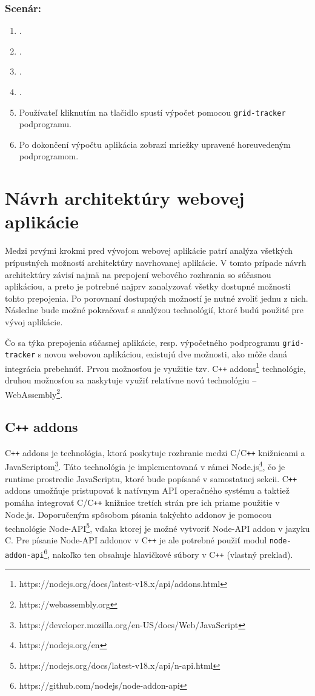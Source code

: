 \subsubsection*{Scenár:}
\begin {enumerate}
\item {}.
\item {}.
\item {}.
\item {}.
\item {Používateľ kliknutím na tlačidlo  spustí výpočet pomocou \texttt{grid-tracker} podprogramu.}
\item {Po dokončení výpočtu aplikácia zobrazí mriežky upravené horeuvedeným podprogramom.}
\end {enumerate}

\section {Návrh architektúry webovej aplikácie}
Medzi prvými krokmi pred vývojom webovej aplikácie patrí analýza všetkých prípustných možností architektúry navrhovanej aplikácie. V tomto prípade návrh architektúry závisí najmä na prepojení webového rozhrania so súčasnou aplikáciou, a preto je potrebné najprv zanalyzovať všetky dostupné možnosti tohto prepojenia. Po porovnaní dostupných možností je nutné zvoliť jednu z nich. Následne bude možné pokračovať s analýzou technológií, ktoré budú použité pre vývoj aplikácie.

Čo sa týka prepojenia súčasnej aplikácie, resp. výpočetného podprogramu \texttt{grid-tracker} s novou webovou aplikáciou, existujú dve možnosti, ako môže daná integrácia prebehnúť. Prvou možnosťou je využitie tzv. C\texttt{++} addons\footnote{https://nodejs.org/docs/latest-v18.x/api/addons.html} technológie, druhou možnosťou sa naskytuje využiť relatívne novú technológiu -- WebAssembly\footnote{https://webassembly.org}.

\subsection {C\texttt{++} addons}
C\texttt{++} addons je technológia, ktorá poskytuje rozhranie medzi C/C\texttt{++} knižnicami a JavaScriptom\footnote{https://developer.mozilla.org/en-US/docs/Web/JavaScript}. Táto technológia je implementovaná v rámci Node.js\footnote{https://nodejs.org/en}, čo je runtime prostredie JavaScriptu, ktoré bude popísané v samostatnej sekcii.
C\texttt{++} addons umožňuje pristupovať k natívnym API operačného systému a taktiež pomáha integrovať C/C\texttt{++} knižnice tretích strán pre ich priame použitie v Node.js. Doporučeným spôsobom písania takýchto addonov je pomocou technológie Node-API\footnote{https://nodejs.org/docs/latest-v18.x/api/n-api.html}, vďaka ktorej je možné vytvoriť Node-API addon v jazyku C. Pre písanie Node-API addonov v C\texttt{++} je ale potrebné použiť modul \texttt{node-addon-api}\footnote{https://github.com/nodejs/node-addon-api}, nakoľko ten obsahuje hlavičkové súbory v C\texttt{++} \cite{cpp_addons} (vlastný preklad).


